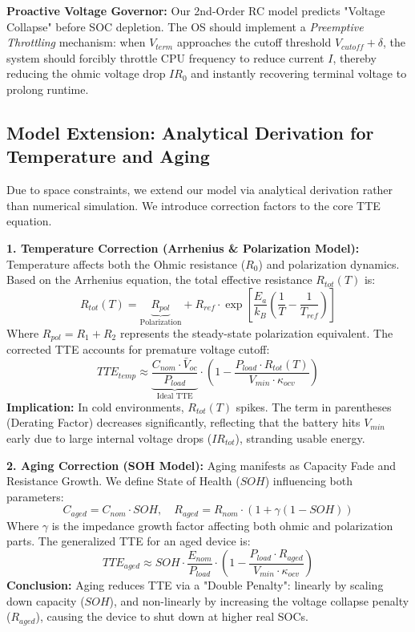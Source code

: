 \textbf{Proactive Voltage Governor:} Our 2nd-Order RC model predicts "Voltage Collapse" before SOC depletion. The OS should implement a \textit{Preemptive Throttling} mechanism: when $V_{term}$ approaches the cutoff threshold $V_{cutoff} + \delta$, the system should forcibly throttle CPU frequency to reduce current $I$, thereby reducing the ohmic voltage drop $IR_0$ and instantly recovering terminal voltage to prolong runtime.

\subsection{Model Extension: Analytical Derivation for Temperature and Aging}
Due to space constraints, we extend our model via analytical derivation rather than numerical simulation. We introduce correction factors to the core TTE equation.

\textbf{1. Temperature Correction (Arrhenius \& Polarization Model):}
Temperature affects both the Ohmic resistance ($R_0$) and polarization dynamics. Based on the Arrhenius equation, the total effective resistance $R_{tot}(T)$ is:
\begin{equation}
    R_{tot}(T) = \underbrace{R_{pol}}_{\text{Polarization}} + R_{ref} \cdot \exp \left[ \frac{E_a}{k_B} \left( \frac{1}{T} - \frac{1}{T_{ref}} \right) \right]
\end{equation}
Where $R_{pol} = R_1 + R_2$ represents the steady-state polarization equivalent. The corrected TTE accounts for premature voltage cutoff:
\begin{equation}
    TTE_{temp} \approx \underbrace{\frac{C_{nom} \cdot \bar{V}_{oc}}{P_{load}}}_{\text{Ideal TTE}} \cdot \left( 1 - \frac{P_{load} \cdot R_{tot}(T)}{V_{min} \cdot \kappa_{ocv}} \right)
\end{equation}
\textbf{Implication:} In cold environments, $R_{tot}(T)$ spikes. The term in parentheses (Derating Factor) decreases significantly, reflecting that the battery hits $V_{min}$ early due to large internal voltage drops ($IR_{tot}$), stranding usable energy.

\textbf{2. Aging Correction (SOH Model):}
Aging manifests as Capacity Fade and Resistance Growth. We define State of Health ($SOH$) influencing both parameters:
\begin{equation}
    C_{aged} = C_{nom} \cdot SOH, \quad R_{aged} = R_{nom} \cdot (1 + \gamma (1-SOH))
\end{equation}
Where $\gamma$ is the impedance growth factor affecting both ohmic and polarization parts. The generalized TTE for an aged device is:
\begin{equation}
    TTE_{aged} \approx SOH \cdot \frac{E_{nom}}{P_{load}} \cdot \left( 1 - \frac{P_{load} \cdot R_{aged}}{V_{min} \cdot \kappa_{ocv}} \right)
\end{equation}
\textbf{Conclusion:} Aging reduces TTE via a "Double Penalty": linearly by scaling down capacity ($SOH$), and non-linearly by increasing the voltage collapse penalty ($R_{aged}$), causing the device to shut down at higher real SOCs.
